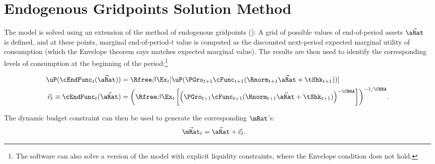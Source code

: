\documentclass[\econtexRoot/BufferStockTheory]{subfiles}
\begin{document}
\section{Endogenous Gridpoints Solution Method}\label{sec:ApndxSolnMethEndogGpts}

The model is solved using an extension of the method of endogenous gridpoints (\cite{carrollEGM}): A grid of possible values of end-of-period assets $\vec{\aRat}$ is defined, and at these points, marginal end-of-period-$t$ value is computed as the discounted next-period expected marginal utility of consumption (which the Envelope theorem says matches expected marginal value).  The results are then used to identify the corresponding levels of consumption at the beginning of the period:\footnote{The software can also solve a version of the model with explicit liquidity constraints, where the Envelope condition does not hold.}

\begin{equation}\begin{gathered}\begin{aligned}
  \uP(\cEndFunc_{t}(\vec{\aRat}))  & = \Rfree \beta \Ex_{t}[ \uP(\PGro_{t+1}
  \cFunc_{t+1}(\Rnorm_{t+1}\vec{\aRat} + \tShk_{t+1}))] \label{eq:cEulerEndog}
\\ \vec{c}_{t} \equiv \cEndFunc_{t}(\vec{\aRat})  & = {\left(\Rfree \beta \Ex_{t}\left[ {\left(\PGro_{t+1}
      \cFunc_{t+1}(\Rnorm_{t+1}\vec{\aRat} +
      \tShk_{t+1})\right)}^{-\CRRA}\right]\right)}^{-1/\CRRA}. \notag
\end{aligned}\end{gathered}\end{equation}

The dynamic budget constraint can then be used to generate the corresponding $\mRat$'s:
\begin{eqnarray*}
  \vec{\mRat}_{t}  & = \vec{\aRat}+\vec{c}_{t}.
\end{eqnarray*}
\end{document}
